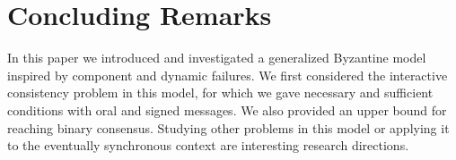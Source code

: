 
\section{Concluding Remarks}

In this paper we introduced and investigated a generalized Byzantine model inspired by component and dynamic failures. We first considered the interactive
consistency problem in this model, for which we gave 
necessary and sufficient conditions with
oral and signed messages. We also provided an upper bound for reaching binary consensus. 
Studying other problems in this model or applying it to the eventually synchronous 
context are interesting research directions. 


